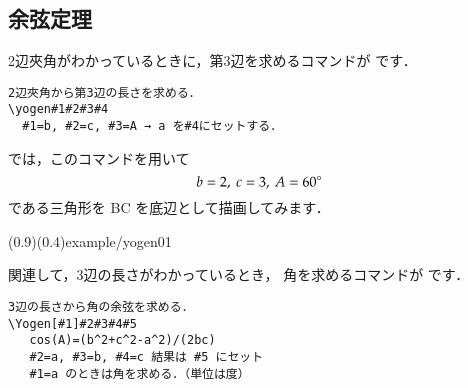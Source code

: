 \subsection{余弦定理}
2辺夾角がわかっているときに，第3辺を求めるコマンドが
 です．
\begin{boxnote}
\begin{verbatim}
2辺夾角から第3辺の長さを求める．
\yogen#1#2#3#4
  #1=b, #2=c, #3=A → a を#4にセットする．
\end{verbatim}
\end{boxnote}
では，このコマンドを用いて
\[ b=2,~c=3,~A=60^{\circ} \]
である三角形を BC を底辺として描画してみます．

\showexample[余弦定理](0.9)(0.4){example/yogen01}

関連して，3辺の長さがわかっているとき，
角を求めるコマンドが  です．
\begin{boxnote}
\begin{verbatim}
3辺の長さから角の余弦を求める．
\Yogen[#1]#2#3#4#5
   cos(A)=(b^2+c^2-a^2)/(2bc)
   #2=a, #3=b, #4=c 結果は #5 にセット
   #1=a のときは角を求める．（単位は度）
\end{verbatim}
\end{boxnote}

